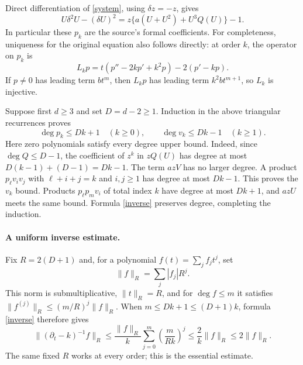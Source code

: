 \documentclass[11pt]{article}
\newcommand{\norm}[1]{\lVert #1\rVert_R}
\begin{document}
Direct differentiation of \eqref{system}, using $\delta z=-z$, gives
\begin{equation}\label{identity}
 U\delta^2U-(\delta U)^2=z\{a(U+U^2)+U^3Q(U)\}-1.
\end{equation}
In particular these $p_k$ are the source's formal coefficients.
For completeness, uniqueness for the original equation also follows
directly: at order $k$, the operator on $p_k$ is
\[
 L_kp=t(p''-2kp'+k^2p)-2(p'-kp).
\]
If $p\neq0$ has leading term $bt^m$, then $L_kp$ has leading term
$k^2bt^{m+1}$, so $L_k$ is injective.

Suppose first $d\geq3$ and set $D=d-2\geq1$.
Induction in the above triangular recurrences proves
\begin{equation}\label{degree}
 \deg p_k\leq Dk+1\quad(k\geq0),\qquad
 \deg v_k\leq Dk-1\quad(k\geq1).
\end{equation}
Here zero polynomials satisfy every degree upper bound.
Indeed, since $\deg Q\leq D-1$, the coefficient of $z^k$ in
$zQ(U)$ has degree at most $D(k-1)+(D-1)=Dk-1$.
The term $azV$ has no larger degree. A product $p_\ell v_i v_j$
with $\ell+i+j=k$ and $i,j\geq1$ has degree at most $Dk-1$.
This proves the $v_k$ bound. Products $p_\ell p_m v_i$ of total
index $k$ have degree at most $Dk+1$, and $azU$ meets the same
bound. Formula \eqref{inverse} preserves degree, completing the induction.

\paragraph{A uniform inverse estimate.}
Fix $R=2(D+1)$ and, for a polynomial $f(t)=\sum_j f_jt^j$, set
\[
 \norm{f}=\sum_j|f_j|R^j.
\]
This norm is submultiplicative, $\norm{t}=R$, and for
$\deg f\leq m$ it satisfies
$\norm{f^{(j)}}\leq (m/R)^j\norm{f}$.
When $m\leq Dk+1\leq(D+1)k$, formula \eqref{inverse} therefore gives
\begin{equation}\label{bound}
 \norm{(\partial_t-k)^{-1}f}
 \leq\frac{\norm{f}}{k}
       \sum_{j=0}^{m}\left(\frac{m}{Rk}\right)^j
 \leq\frac{2}{k}\norm{f}\leq2\norm{f}.
\end{equation}
The same fixed $R$ works at every order; this is the essential estimate.
\end{document}
